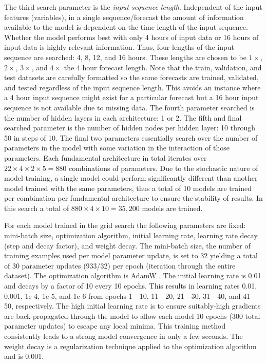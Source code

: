 The third search parameter is the \textit{input sequence length}. Independent of the input features (variables), in a single sequence/forecast the amount of information available to the model is dependent on the time-length of the input sequence. Whether the model performs best with only 4 hours of input data or 16 hours of input data is highly relevant information. Thus, four lengths of the input sequence are searched: 4, 8, 12, and 16 hours. These lengths are chosen to be $1\times$, $2\times$, $3\times$, and $4\times$ the 4 hour forecast length. Note that the train, validation, and test datasets are carefully formatted so the same forecasts are trained, validated, and tested regardless of the input sequence length. This avoids an instance where a 4 hour input sequence might exist for a particular forecast but a 16 hour input sequence is not available due to missing data. The fourth parameter searched is the number of hidden layers in each architecture: 1 or 2. The fifth and final searched parameter is the number of hidden nodes per hidden layer: 10 through 50 in steps of 10. The final two parameters essentially search over the number of parameters in the model with some variation in the interaction of those parameters. Each fundamental architecture in total iterates over $22 \times 4 \times 2 \times 5 = 880$ combinations of parameters. Due to the stochastic nature of model training, a single model could perform significantly different than another model trained with the same parameters, thus a total of 10 models are trained per combination per fundamental architecture to ensure the stability of results. In this search a total of $880 \times 4 \times 10 = 35,200$ models are trained.

For each model trained in the grid search the following parameters are fixed: mini-batch size, optimization algorithm, initial learning rate, learning rate decay (step and decay factor), and weight decay. The mini-batch size, the number of training examples used per model parameter update, is set to 32 yielding a total of 30 parameter updates (933/32) per epoch (iteration through the entire dataset). The optimization algorithm is AdamW\cite{kingma2017adam} \cite{loshchilov2019decoupled}. The initial learning rate is 0.01 and decays by a factor of 10 every 10 epochs. This results in learning rates 0.01, 0.001, 1e-4, 1e-5, and 1e-6 from epochs 1 - 10, 11 - 20, 21 - 30, 31 - 40, and 41 - 50, respectively. The high initial learning rate is to ensure suitably-high gradients are back-propagated through the model to allow each model 10 epochs (300 total parameter updates) to escape any local minima. This training method consistently leads to a strong model convergence in only a few seconds. The weight decay is a regularization technique applied to the optimization algorithm and is 0.001.

